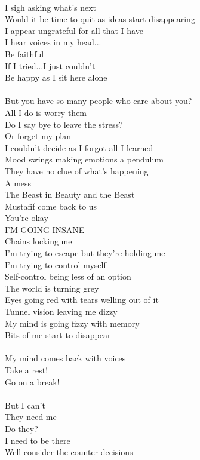 \documentclass[12pt, b5paper, oneside]{book}
\begin{document}
\\I sigh asking what's next
\\Would it be time to quit as ideas start disappearing
\\I appear ungrateful for all that I have
\\I hear voices in my head...
\\Be faithful
\\If I tried...I just couldn't
\\Be happy as I sit here alone
%
\\\\But you have so many people who care about you?
\\All I do is worry them
\\Do I say bye to leave the stress?
\\Or forget my plan
\\I couldn't decide as I forgot all I learned
\\Mood swings making emotions a pendulum
\\They have no clue of what's happening
\\A mess
\\The Beast in Beauty and the Beast
\\Mustafif come back to us
\\You're okay
\\I'M GOING INSANE
\\Chains locking me
\\I'm trying to escape but they're holding me
\\I'm trying to control myself
\\Self-control being less of an option
\\The world is turning grey
\\Eyes going red with tears welling out of it
\\Tunnel vision leaving me dizzy
\\My mind is going fizzy with memory
\\Bits of me start to disappear 
%
\\\\My mind comes back with voices
\\Take a rest!
\\Go on a break!
%
\\\\But I can't
\\They need me
\\Do they?
\\I need to be there
\\Well consider the counter decisions
\end{document}
